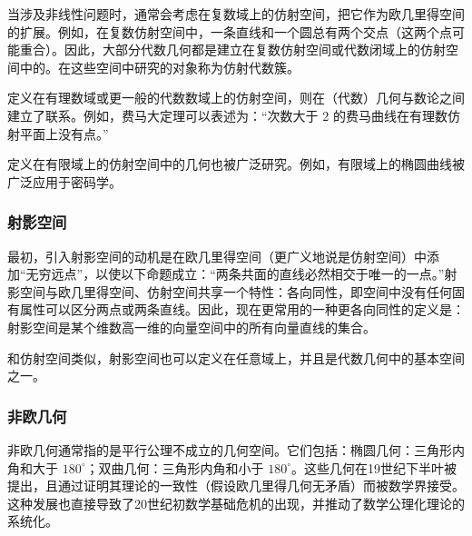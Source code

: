 当涉及非线性问题时，通常会考虑在复数域上的仿射空间，把它作为欧几里得空间的扩展。例如，在复数仿射空间中，一条直线和一个圆总有两个交点（这两个点可能重合）。因此，大部分代数几何都是建立在复数仿射空间或代数闭域上的仿射空间中的。在这些空间中研究的对象称为仿射代数簇。

定义在有理数域或更一般的代数数域上的仿射空间，则在（代数）几何与数论之间建立了联系。例如，费马大定理可以表述为：“次数大于 2 的费马曲线在有理数仿射平面上没有点。”

定义在有限域上的仿射空间中的几何也被广泛研究。例如，有限域上的椭圆曲线被广泛应用于密码学。
\subsubsection{射影空间}
最初，引入射影空间的动机是在欧几里得空间（更广义地说是仿射空间）中添加“无穷远点”，以使以下命题成立：“两条共面的直线必然相交于唯一的一点。”射影空间与欧几里得空间、仿射空间共享一个特性：各向同性，即空间中没有任何固有属性可以区分两点或两条直线。因此，现在更常用的一种更各向同性的定义是：射影空间是某个维数高一维的向量空间中的所有向量直线的集合。

和仿射空间类似，射影空间也可以定义在任意域上，并且是代数几何中的基本空间之一。
\subsubsection{非欧几何}
非欧几何通常指的是平行公理不成立的几何空间。它们包括：椭圆几何：三角形内角和大于 $180^\circ$；双曲几何：三角形内角和小于 $180^\circ$。这些几何在19世纪下半叶被提出，且通过证明其理论的一致性（假设欧几里得几何无矛盾）而被数学界接受。这种发展也直接导致了20世纪初数学基础危机的出现，并推动了数学公理化理论的系统化。
